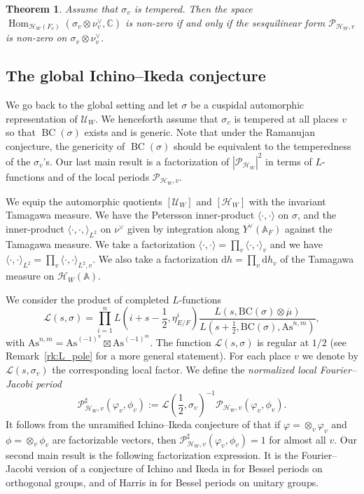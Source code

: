 \documentclass[letterpaper,11pt]{amsart}
\newcommand{\bA}{\mathbb{A}}
\newcommand{\C}{\mathbb{C}}
\newcommand{\cH}{\mathcal{H}}
\newcommand{\cL}{\mathcal{L}}
\newcommand{\cP}{\mathcal{P}}
\newcommand{\cU}{\mathcal{U}}
\newcommand{\rd}{\mathrm{d}}
\newcommand{\<}{\negthickspace}
\newcommand{\valP}[1]{\left|#1\right|}
\DeclareMathOperator{\Hom}{Hom}
\DeclareMathOperator{\BC}{BC}
\theoremstyle{definition}
\theoremstyle{plain}
\newtheorem{theorem}[definition]{Theorem}
\theoremstyle{remark}
\numberwithin{equation}{section}
\begin{document}
\begin{theorem}
    \label{thm:temp_int}
    Assume that $\sigma_v$ is tempered. Then the space $\Hom_{\cH_W(F_v)}(\sigma_v \otimes \nu^\vee_v,\C)$ is non-zero if and only if the sesquilinear form $\cP_{\cH_W,v}$ is non-zero on $\sigma_v \otimes \nu^\vee_v$.
\end{theorem}

\subsection{The global Ichino--Ikeda conjecture}
\label{subsec:global_II}

We go back to the global setting and let $\sigma$ be a cuspidal automorphic representation of $\cU_W$. We henceforth assume that $\sigma_v$ is tempered at all places $v$ so that $\BC(\sigma)$ exists and is generic. Note that under the Ramanujan conjecture, the genericity of $\BC(\sigma)$ should be equivalent to the temperedness of the $\sigma_v$'s. Our last main result is a factorization of $\valP{\cP_{\cH_W}}^2$ in terms of $L$-functions and of the local periods $\cP_{\cH_W,v}$.

We equip the automorphic quotients $[\cU_W]$ and $[\cH_W]$ with the invariant Tamagawa measure. We have the Petersson inner-product $\langle \cdot,\cdot \rangle$ on $\sigma$, and the inner-product $\langle \cdot,\cdot,\rangle_{L^2}$ on $\nu^\vee$ given by integration along $Y^\vee(\bA_F)$ against the Tamagawa measure. We take a factorization $\langle \cdot,\cdot \rangle=\prod_v \langle \cdot,\cdot \rangle_v$ and we have $\langle \cdot,\cdot \rangle_{L^2}=\prod_v \langle \cdot,\cdot \rangle_{L^2,v}$. We also take a factorization $\rd h =\prod_v \rd h_v$ of the Tamagawa measure on $\cH_W(\bA)$.

We consider the product of completed $L$-functions
\begin{equation*}
    \cL(s,\sigma)=\prod_{i=1}^n L(i+s-\frac{1}{2},\eta_{E/F}^i)\frac{L(s,\mathrm{BC}(\sigma) \otimes \overline{\mu})}{L(s+\frac{1}{2},\mathrm{BC}(\sigma),\mathrm{As}^{n,m})},
\end{equation*}
with $\mathrm{As}^{n,m}=\mathrm{As}^{(-1)^n} \boxtimes \mathrm{As}^{(-1)^m}$. The function $\cL(s,\sigma)$ is regular at $1/2$ (see Remark~\ref{rk:L_pole} for a more general statement). For each place $v$ we denote by $\cL(s,\sigma_v)$ the corresponding local factor. We define the \emph{normalized local Fourier--Jacobi period} 
\begin{equation*}
    \cP^\sharp_{\cH_W,v}(\varphi_v,\phi_v):=\cL(\frac{1}{2},\sigma_v)^{-1}  \cP_{\cH_W,v}(\varphi_v,\phi_v).
\end{equation*}
It follows from the unramified Ichino--Ikeda conjecture of \cite{Boi} that if
$\varphi=\otimes_v \varphi_v$ and $\phi=\otimes_v \phi_v$ are
factorizable vectors, then $\cP^\sharp_{\cH_W,v}(\varphi_v,\phi_v)=1$ for almost all $v$. Our second main result is the following factorization expression. It is the Fourier--Jacobi version of a conjecture of Ichino and Ikeda in \cite{II} for Bessel periods on orthogonal groups, and of Harris in \cite{NHarris} for Bessel periods on unitary groups.
\end{document}
